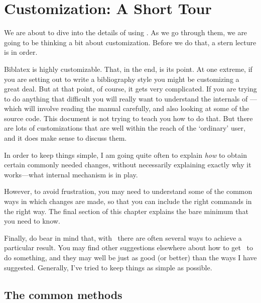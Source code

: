 \chapter{Customization: A Short Tour}\label{ch:customize1}

We are about to dive into the details of using \biblatex. As we go
through them, we are going to be thinking a bit about
customization. Before we do that, a stern lecture is in order.

\textsf{Biblatex} is highly customizable. That, in the end, is its
point. At one extreme, if you are setting out to write a bibliography
style you might be customizing a great deal. But at that point, of
course, it gets very complicated. If you are trying to do anything
that difficult you will really want to understand the internals of
\biblatex---which will involve reading the manual
carefully, and also looking at some of the
source code. This document is not trying to teach you how to do that. But
there are lots of customizations that are well within the reach of the
`ordinary' user, and it does make sense to discuss them.

In order to keep things simple, I am going quite often to explain
\emph{how} to obtain certain commonly needed changes, without
necessarily explaining exactly why it works---what internal mechanism
is in play.

However, to avoid frustration, you may need to understand some of the
common ways in which changes are made, so that you can include the
right commands in the right way. The final section of this chapter
explains the bare minimum that you need to know.

Finally, do bear in mind that, with \biblatex\ there are often several
ways to achieve a particular result. You may find other suggestions
elsewhere about how to get \biblatex\ to do something, and they may
well be just as good (or better) than the ways I have
suggested. Generally, I've tried to keep things as simple as possible.

\section{The common methods}

